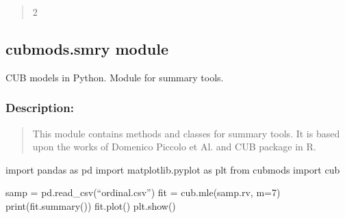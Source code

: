 \documentclass[letterpaper,10pt,english]{sphinxmanual}
\begin{document}
\begin{fulllineitems}
\label{\detokenize{cubmods:cubmods.multicub.pos_kwargs}}
\pysigstartsignatures
{}
\pysigstopsignatures\begin{quote}
\begin{quote}

\end{quote}

   2
\end{quote}
\begin{description}
\begin{description}

\end{description}

\end{description}

\end{fulllineitems}



\subsection{cubmods.smry module}
\label{\detokenize{cubmods:module-cubmods.smry}}\label{\detokenize{cubmods:cubmods-smry-module}}
\sphinxAtStartPar
CUB models in Python.
Module for summary tools.


\subsubsection{Description:}
\label{\detokenize{cubmods:id254}}\begin{quote}

\sphinxAtStartPar
This module contains methods and classes
for summary tools.
It is based upon the works of Domenico
Piccolo et Al. and CUB package in R.
\end{quote}
\begin{description}
\sphinxAtStartPar
import pandas as pd
import matplotlib.pyplot as plt
from cubmods import cub

\sphinxAtStartPar
samp = pd.read\_csv(“ordinal.csv”)
fit = cub.mle(samp.rv, m=7)
print(fit.summary())
fit.plot()
plt.show()

\end{description}
\end{document}
